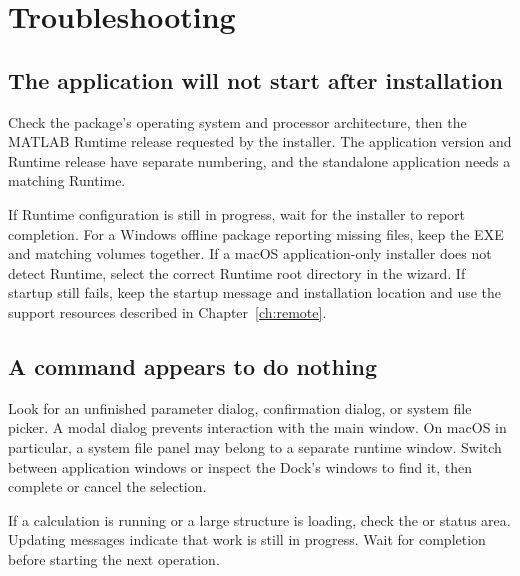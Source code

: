 \chapter{Troubleshooting}\label{ch:troubleshooting}


\section{The application will not start after installation}

Check the package's operating system and processor architecture, then the MATLAB\regmark{} Runtime release requested by the installer. The application version and Runtime release have separate numbering, and the standalone application needs a matching Runtime.

If Runtime configuration is still in progress, wait for the installer to report completion. For a Windows offline package reporting missing files, keep the EXE and matching volumes together. If a macOS application-only installer does not detect Runtime, select the correct Runtime root directory in the wizard. If startup still fails, keep the startup message and installation location and use the support resources described in Chapter~\ref{ch:remote}.

\section{A command appears to do nothing}

Look for an unfinished parameter dialog, confirmation dialog, or system file picker. A modal dialog prevents interaction with the main window. On macOS in particular, a system file panel may belong to a separate runtime window. Switch between application windows or inspect the Dock's windows to find it, then complete or cancel the selection.

If a calculation is running or a large structure is loading, check the  or status area. Updating messages indicate that work is still in progress. Wait for completion before starting the next operation.

